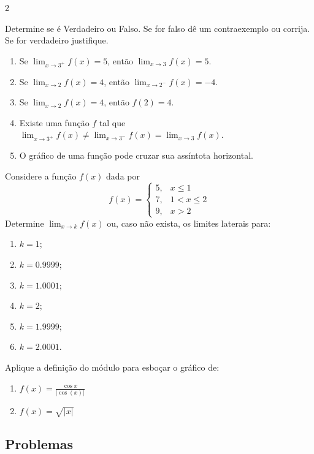 \documentclass[12pt,a4paper]{article}
\begin{document}
\begin{multicols*}{2}
\begin{description}[font=\bfseries, leftmargin=0pt]
    \item[Fix 1.3:] Determine se é Verdadeiro ou Falso. Se for falso dê um contraexemplo ou corrija. Se for verdadeiro justifique.
    \begin{enumerate}[label=(\alph*)]
      \item Se $\displaystyle\lim_{x\to 3^+} f(x) = 5$, então $\displaystyle\lim_{x\to 3} f(x) = 5$.
      \item Se $\displaystyle\lim_{x\to 2} f(x) = 4$, então $\displaystyle\lim_{x\to 2^-} f(x) = -4$.
      \item Se $\displaystyle\lim_{x\to 2} f(x) = 4$, então $f(2) = 4$.
      \item Existe uma função $f$ tal que $\displaystyle\lim_{x\to 3^+} f(x) \ne \lim_{x\to 3^-} f(x) = \lim_{x\to 3} f(x)$.
      \item O gráfico de uma função pode cruzar sua assíntota horizontal.
    \end{enumerate}

    \item[Fix 1.4:] Considere a função $f(x)$ dada por 
    \[
    f(x) = \begin{cases} 5, & x \le 1 \\ 7, & 1 < x \le 2 \\ 9, & x > 2 \end{cases}
    \]
    Determine $\displaystyle\lim_{x\to k} f(x)$ ou, caso não exista, os limites laterais para:
    \begin{enumerate}[label=(\alph*), itemsep=0pt]
      \item $k=1$;
      \item $k=0.9999$;
      \item $k=1.0001$;
      \item $k=2$;
      \item $k=1.9999$;
      \item $k=2.0001$.
    \end{enumerate}

    \item[Fix 1.5:] Aplique a definição do módulo para esboçar o gráfico de:
    \begin{enumerate}[label=(\alph*)]
      \item $f(x) = \frac{\cos x}{|\cos(x)|}$
      \item $f(x) = \sqrt{|x|}$
    \end{enumerate}
  \end{description}

\subsection*{Problemas}


\end{multicols*}
\end{document}
